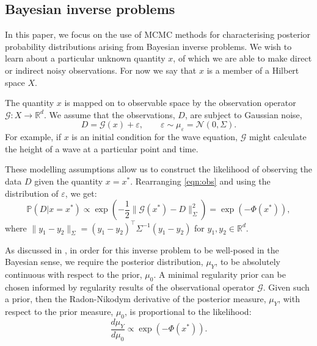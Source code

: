 \documentclass[final]{siamltex}
\newcommand{\data}{D}
\begin{document}
\subsection{Bayesian inverse problems}

In this paper, we focus on the use of MCMC methods for characterising
posterior probability distributions arising from Bayesian inverse problems. We
wish to learn about a particular unknown quantity $x$, of which we are
able to make direct or indirect noisy observations. For now
we say that $x$ is a member of a Hilbert
space $X$. 

The quantity $x$ is mapped on to observable space by the observation
operator $\mathcal{G}:X \to\mathbb{R}^d$. We assume that the
observations, $\data$, are subject to Gaussian noise,
\begin{equation}\label{eqn:obs}
	\data = \mathcal{G}(x) + \varepsilon, \qquad \varepsilon \sim \mu_{\varepsilon} = \mathcal{N}(0,\Sigma).
\end{equation}
For example, if $x$ is an initial condition for the wave equation,
$\mathcal{G}$ might calculate the height of a wave at a particular point and time.

These modelling assumptions allow us to construct the 
likelihood of observing the data $\data$ given the quantity $x =
x^*$. Rearranging \eqref{eqn:obs} and using the distribution of
$\varepsilon$, we get:
\begin{equation}\label{eqn:like}
	\mathbb{P}(\data|x=x^*) \propto \exp \left ( -\frac{1}{2} \|\mathcal{G}(x^*)
	  - \data\|_\Sigma^2 \right ) = \exp\left(-\Phi(x^*)\right),
\end{equation}
where $\| y_1 - y_2 \|_\Sigma = (y_1-y_2)^\top\Sigma^{-1}(y_1-y_2)$ for $y_1,y_2 \in \mathbb{R}^d$.

As discussed in \cite{stuart2010inverse,cotter2009bayesian},
in order for this inverse problem to be well-posed in the Bayesian
sense, we require the posterior distribution, $\mu_Y$, to be absolutely
continuous with respect to the prior, $\mu_0$. A
minimal regularity prior can be chosen informed by regularity results
of the observational operator $\mathcal{G}$. Given such a prior, then
the Radon-Nikodym derivative of the posterior measure, $\mu_Y$, with
respect to the prior measure, $\mu_0$, is proportional to the
likelihood:
\begin{equation}\label{eqn:RND}
	\frac{d\mu_Y}{d\mu_0} \propto \exp \left ( -\Phi(x^*) \right ).
\end{equation}
\end{document}
